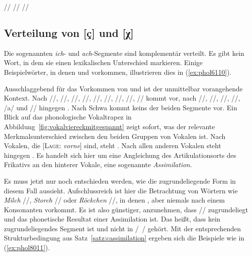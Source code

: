 \begin{exe}
  \ex\label{ex:phol013} \begin{xlist}
    \ex // \phopro \textipa{[ve:k]}
    \ex // \phopro \textipa{[h\o:l@]}
    \ex // \phopro \textipa{[Po:f@n]}
  \end{xlist}
\end{exe}

\subsection{Verteilung von [ç] und [χ]}

\label{sec:verteilungvonichach}

Die sogenannten \textit{ich}- und \textit{ach}-Segmente sind komplementär verteilt.
Es gibt kein Wort, in dem sie einen lexikalischen Unterschied markieren.
Einige Beispielwörter, in denen \textipa{[\c{c}]} und \textipa{[X]} vorkommen, illustrieren dies in (\ref{ex:phol6110}).

\begin{exe}
  \ex\label{ex:phol6110}
  \begin{xlist}
  \end{xlist}
\end{exe}

Ausschlaggebend für das Vorkommen von \textipa{[\c{c}]} und \textipa{[X]} ist der unmittelbar vorangehende Kontext.
Nach //, //, //, //, //, //, //, /\textipa{\o}/, /\textipa{\oe}/ kommt \textipa{[\c{c}]} vor, nach //, //, //, //, /a/ und // hingegen \textipa{[X]}.
Nach Schwa kommt keins der beiden Segmente vor.
Ein Blick auf das phonologische Vokaltrapez in Abbildung~\ref{fig:vokalviereckmitgespannt} zeigt sofort, was der relevante Merkmalsunterschied zwischen den beiden Gruppen von Vokalen ist.
Nach Vokalen, die [\textsc{Lage}: \textit{vorne}] sind, steht \textipa{[\c{c}]}.
Nach allen anderen Vokalen steht hingegen \textipa{[X]}.
Es handelt sich hier um eine Angleichung des Artikulationsorts des Frikativs an den hinterer Vokale, eine sogenannte \textit{Assimilation}.

Es muss jetzt nur noch entschieden werden, wie die zugrundeliegende Form in diesem Fall aussieht.
Aufschlussreich ist hier die Betrachtung von Wörtern wie \textit{Milch} //, \textit{Storch} // oder \textit{Röckchen} //, in denen \textipa{[\c{c}]}, aber niemals \textipa{[X]} nach einem Konsonanten vorkommt.
Es ist also günstiger, anzunehmen, dass // zugrundeliegt und \textipa{[X]} das phonetische Resultat einer Assimilation ist.
Das heißt, dass \textipa{[X]} kein zugrundeliegendes Segment ist und nicht in /~/ gehört.
Mit der entsprechenden Strukturbedingung aus Satz~\ref{satz:cassimilation} ergeben sich die Beispiele wie in (\ref{ex:phol8011}).


